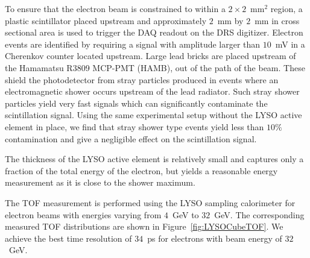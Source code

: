 To ensure that the electron beam is constrained to within a $2\times 2$~mm$^2$ region, 
a plastic scintillator placed upstream and approximately $2$~mm by $2$~mm in cross sectional 
area is used to trigger the DAQ readout on the DRS  digitizer. Electron events are identified 
by requiring a signal with amplitude larger than $10$~mV in a Cherenkov counter located 
upstream. Large lead bricks are placed upstream of the Hamamatsu R3809 MCP-PMT (HAMB),
out of the path of the beam. These shield the photodetector from stray particles
produced in events where an electromagnetic shower occurs upstream of the lead
radiator. Such stray shower particles yield very fast signals which can
significantly contaminate the scintillation signal. Using the same experimental
setup without the LYSO active element in place, we find that stray shower type
events yield less than $10\%$ contamination and give a negligible effect on the
scintillation signal. 


The thickness of the LYSO active element is relatively small and captures only a fraction 
of the total energy of the electron, but yields a reasonable energy measurement
as it is close to the shower maximum.

The TOF measurement is performed using the LYSO sampling calorimeter
for electron beams with energies varying from $4$~GeV to $32$~GeV. The corresponding 
measured TOF distributions are shown in Figure~\ref{fig:LYSOCubeTOF}.
We achieve the best time resolution of $34$~ps for electrons
with beam energy of $32$~GeV.

